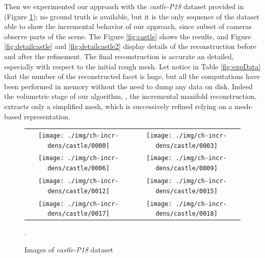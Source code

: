 Then we experimented our approach with the \emph{castle-P18} dataset provided in \cite{strecha2008} (Figure \ref{fig:castleOriginal}); no ground truth is available, but it is the only sequence of the dataset able to show the incremental behavior of our approach, since subset of cameras observe parts of the scene. 
The Figure \ref{fig:castle} shows the results, and Figure \ref{fig:detailcastle} and \ref{fig:detailcastle2} display details of the reconstruction before and after the refinement. The final reconstruction is accurate  an detailed, especially with respect to the initial rough mesh.
Let notice in Table \ref{fig:expData} that the number of the reconstructed facet is huge, but all the computations have been performed in memory without the need to dump any data on disk. Indeed the volumetric stage of our algorithm, \ie, the incremental manifold reconstruction, extracts only a  simplified mesh, which is successively refined relying on a mesh-based representation.


\begin{figure}[tbhp]
\centering
\setlength{\tabcolsep}{1px}
\begin{tabular}{cc}
\texttt{[image: ./img/ch-incr-dens/castle/0000]}&
\texttt{[image: ./img/ch-incr-dens/castle/0003]}\\
\texttt{[image: ./img/ch-incr-dens/castle/0006]}&
\texttt{[image: ./img/ch-incr-dens/castle/0009]}\\
\texttt{[image: ./img/ch-incr-dens/castle/0012]}&
\texttt{[image: ./img/ch-incr-dens/castle/0015]}\\
\texttt{[image: ./img/ch-incr-dens/castle/0017]}&
\texttt{[image: ./img/ch-incr-dens/castle/0018]}\\
\end{tabular}
\caption{Images of \emph{castle-P18} dataset}.
\label{fig:castleOriginal}
\end{figure}




